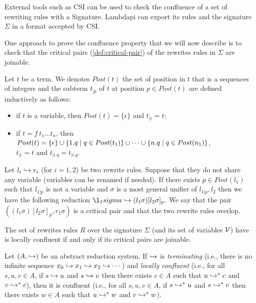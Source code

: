 \begin{remark}
External tools such as CSI \cite{CSI} can be used to check the confluence of a set of rewriting rules with a Signature.
Lambdapi can export its rules and the signature $\Sigma$ in a format accepted by CSI.
\end{remark}

One approach to prove the confluence property that we will now describe is to check that the critical pairs (\cref{def:critical-pair}) of the rewrites rules in $\Sigma$ are joinable.

\begin{definition}
Let $t$ be a term. We denotes $Post(t)$ the set of position in $t$ that is a sequences of integers and the subterm $t_{| p}$ of $t$
at position $p \in Post(t)$ are defined inductively as follows:
\begin{itemize}
  \item if $t$ is a variable, then $Post(t) = \{ \epsilon \}$ and $t_{| \epsilon} = t$;
  \item if $t = f~t_1 \dots t_n$, then \( Post(t) = \{ \epsilon \} \cup \{1.q \pipe q \in Post(t_1)\} \cup \dots \cup \{n.q \pipe q \in Post(n_1)\} \),
    \( t_{| \epsilon} = t \text{ and } t_{| i.q} = t_{| i.q} \).

\end{itemize}
\end{definition}

\begin{definition}\label{def:critical-pair}
Let $l_i \re r_i$ (for $i = 1, 2$) be two rewrite rules. Suppose that they do not share any variable (variables can be renamed if needed).
If there exists $p \in Post(l_1)$ such that $l_{1 | p}$ is not a variable and $\sigma$ is a most general unifier of $l_{1 | p}, l_2$ then
we have the following reduction $\l_1sigma \re (l_1\sigma)[l_2\sigma]_p$. We say that the pair $((l_1\sigma)[l_2\sigma]_p, r_1\sigma)$ is a
critical pair and that the two rewrite rules overlop.
\end{definition}

\begin{theorem}\label{thm:cp}
The set of rewrites rules $R$ over the signature $\Sigma$ (and its set of variables $\cal{V}$) have  is locally confluent if and only if its critical pairs are joinable.
\end{theorem}


\begin{lemma}\label{lem:newman}
Let $(A, \re)$ be an abstract reduction system. If $\re$ is \emph{terminating} (i.e., there is no infinite sequence
$x_0 \re x_1 \re x_2 \re \cdots$) and \emph{locally confluent} (i.e., for all $s,u,v \in A$, if $s \re u$ and $s \re v$ then there exists
$c \in A$ such that $u \re^{*} c$ and $v \re^{*} c$), then it is confluent (i.e., for all $s,u,v \in A$, if $s \re^{*} u$ and
$s \re^{*} v$ then there exists $w \in A$ such that $u \re^{*} w$ and $v \re^{*} w$).
\end{lemma}

